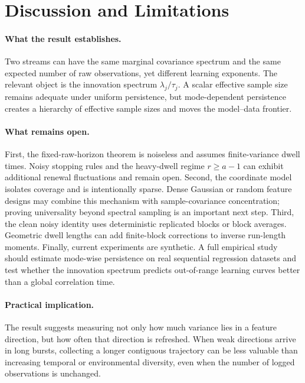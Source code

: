 \section{Discussion and Limitations}

\paragraph{What the result establishes.}
Two streams can have the same marginal covariance spectrum and the same
expected number of raw observations, yet different learning exponents. The
relevant object is the innovation spectrum $\lambda_j/\tau_j$. A scalar
effective sample size remains adequate under uniform persistence, but
mode-dependent persistence creates a hierarchy of effective sample sizes and
moves the model--data frontier.

\paragraph{What remains open.}
First, the fixed-raw-horizon theorem is noiseless and assumes finite-variance
dwell times. Noisy stopping rules and the heavy-dwell regime $r\ge a-1$ can
exhibit additional renewal fluctuations and remain open. Second, the
coordinate model isolates coverage and is intentionally sparse. Dense Gaussian
or random feature designs may combine this mechanism with sample-covariance
concentration; proving universality beyond spectral sampling is an important
next step. Third, the clean noisy identity uses deterministic replicated
blocks or block averages. Geometric dwell lengths can add finite-block
corrections to inverse run-length moments. Finally, current experiments are
synthetic. A full empirical study should estimate mode-wise persistence on
real sequential regression datasets and test whether the innovation spectrum
predicts out-of-range learning curves better than a global correlation time.

\paragraph{Practical implication.}
The result suggests measuring not only how much variance lies in a feature
direction, but how often that direction is refreshed. When weak directions
arrive in long bursts, collecting a longer contiguous trajectory can be less
valuable than increasing temporal or environmental diversity, even when the
number of logged observations is unchanged.


